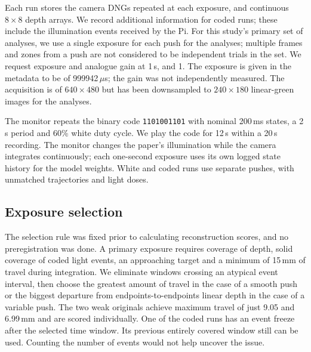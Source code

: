 Each run stores the camera DNGs repeated at each exposure, and continuous $8\times8$ depth arrays. We record additional information for coded runs; these include the illumination events received by the Pi. For this study's primary set of analyses, we use a single exposure for each push for the analyses; multiple frames and zones from a push are not considered to be independent trials in the set. We request exposure and analogue gain at 1\,s, and 1. The exposure is given in the metadata to be of 999942\,$\mu$s; the gain was not independently measured. The acquisition is of $640\times480$ but has been downsampled to $240\times180$ linear-green images for the analyses.

The monitor repeats the binary code \texttt{1101001101} with nominal 200\,ms states, a 2\,s period and 60\% white duty cycle. We play the code for 12\,s within a 20\,s recording. The monitor changes the paper's illumination while the camera integrates continuously; each one-second exposure uses its own logged state history for the model weights. White and coded runs use separate pushes, with unmatched trajectories and light doses.

\subsection{Exposure selection}
The selection rule was fixed prior to calculating reconstruction scores, and no preregistration was done. A primary exposure requires coverage of depth, solid coverage of coded light events, an approaching target and a minimum of 15\,mm of travel during integration. We eliminate windows crossing an atypical event interval, then choose the greatest amount of travel in the case of a smooth push or the biggest departure from endpoints-to-endpoints linear depth in the case of a variable push. The two weak originals achieve maximum travel of just 9.05 and 6.99\,mm and are scored individually. One of the coded runs has an event freeze after the selected time window. Its previous entirely covered window still can be used. Counting the number of events would not help uncover the issue.
